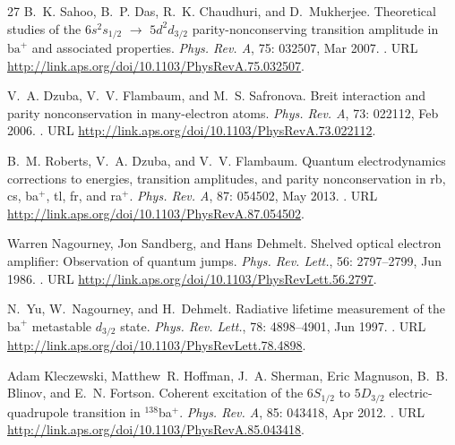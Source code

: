 \documentclass[%
 reprint,
 amsmath,amssymb,
 aps,
]{revtex4-1}
\begin{document}
\begin{thebibliography}{27}
B.~K. Sahoo, B.~P. Das, R.~K. Chaudhuri, and D.~Mukherjee.
\newblock Theoretical studies of the $6s^{2}s_{1/2}$ $\rightarrow$
  $5d^{2}d_{3/2}$ parity-nonconserving transition amplitude in
  ${\mathrm{ba}}^{+}$ and associated properties.
\newblock \emph{Phys. Rev. A}, 75: 032507, Mar 2007.
\newblock {}.
\newblock URL \url{http://link.aps.org/doi/10.1103/PhysRevA.75.032507}.

V.~A. Dzuba, V.~V. Flambaum, and M.~S. Safronova.
\newblock Breit interaction and parity nonconservation in many-electron atoms.
\newblock \emph{Phys. Rev. A}, 73: 022112, Feb 2006.
\newblock {}.
\newblock URL \url{http://link.aps.org/doi/10.1103/PhysRevA.73.022112}.

B.~M. Roberts, V.~A. Dzuba, and V.~V. Flambaum.
\newblock Quantum electrodynamics corrections to energies, transition
  amplitudes, and parity nonconservation in rb, cs, ba${}^{+}$, tl, fr, and
  ra${}^{+}$.
\newblock \emph{Phys. Rev. A}, 87: 054502, May 2013.
\newblock {}.
\newblock URL \url{http://link.aps.org/doi/10.1103/PhysRevA.87.054502}.

Warren Nagourney, Jon Sandberg, and Hans Dehmelt.
\newblock Shelved optical electron amplifier: Observation of quantum jumps.
\newblock \emph{Phys. Rev. Lett.}, 56: 2797--2799, Jun 1986.
\newblock {}.
\newblock URL \url{http://link.aps.org/doi/10.1103/PhysRevLett.56.2797}.

N.~Yu, W.~Nagourney, and H.~Dehmelt.
\newblock Radiative lifetime measurement of the ${\mathrm{ba}}^{+}$ metastable
  ${\mathit{d}}_{3/2}$ state.
\newblock \emph{Phys. Rev. Lett.}, 78: 4898--4901, Jun 1997.
\newblock {}.
\newblock URL \url{http://link.aps.org/doi/10.1103/PhysRevLett.78.4898}.

Adam Kleczewski, Matthew~R. Hoffman, J.~A. Sherman, Eric Magnuson, B.~B.
  Blinov, and E.~N. Fortson.
\newblock Coherent excitation of the $6{S}_{1/2}$ to $5{D}_{3/2}$
  electric-quadrupole transition in ${}^{138}$ba${}^{+}$.
\newblock \emph{Phys. Rev. A}, 85: 043418, Apr 2012.
\newblock {}.
\newblock URL \url{http://link.aps.org/doi/10.1103/PhysRevA.85.043418}.


\end{thebibliography}
\end{document}
